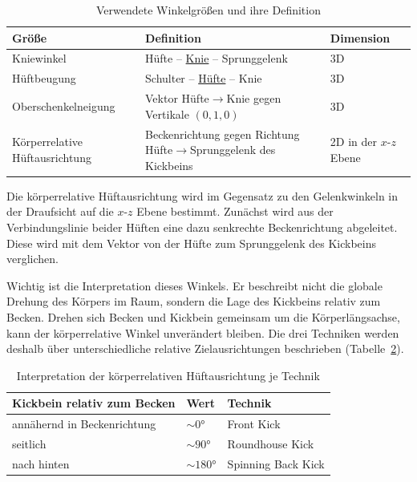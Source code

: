 \documentclass[intern]{cgMA}
\begin{document}
\begin{table}[h]
\centering
\small
\begin{tabular}{p{} p{} p{}}
\hline
\textbf{Größe} & \textbf{Definition} & \textbf{Dimension} \\ \hline
Kniewinkel & Hüfte -- \underline{Knie} -- Sprunggelenk & 3D \\
Hüftbeugung & Schulter -- \underline{Hüfte} -- Knie & 3D \\
Oberschenkelneigung & Vektor Hüfte$\rightarrow$Knie gegen Vertikale $(0,1,0)$ & 3D \\
Körperrelative Hüftausrichtung & Beckenrichtung gegen Richtung Hüfte$\rightarrow$Sprunggelenk des Kickbeins & 2D in der $x$-$z$ Ebene \\ \hline
\end{tabular}
\caption{Verwendete Winkelgrößen und ihre Definition}
\label{tab:angles}
\end{table}

Die körperrelative Hüftausrichtung wird im Gegensatz zu den Gelenkwinkeln in der Draufsicht auf die $x$-$z$ Ebene bestimmt. Zunächst wird aus der Verbindungslinie beider Hüften eine dazu senkrechte Beckenrichtung abgeleitet. Diese wird mit dem Vektor von der Hüfte zum Sprunggelenk des Kickbeins verglichen.

Wichtig ist die Interpretation dieses Winkels. Er beschreibt nicht die globale Drehung des Körpers im Raum, sondern die Lage des Kickbeins relativ zum Becken. Drehen sich Becken und Kickbein gemeinsam um die Körperlängsachse, kann der körperrelative Winkel unverändert bleiben. Die drei Techniken werden deshalb über unterschiedliche relative Zielausrichtungen beschrieben (Tabelle~\ref{tab:hip_alignment_technique}).

\begin{table}[h]
\centering
\begin{tabular}{lll}
\hline
\textbf{Kickbein relativ zum Becken} & \textbf{Wert} & \textbf{Technik} \\ \hline
annähernd in Beckenrichtung & $\sim 0°$ & Front Kick \\
seitlich & $\sim 90°$ & Roundhouse Kick \\
nach hinten & $\sim 180°$ & Spinning Back Kick \\ \hline
\end{tabular}
\caption{Interpretation der körperrelativen Hüftausrichtung je Technik}
\label{tab:hip_alignment_technique}
\end{table}
\end{document}
